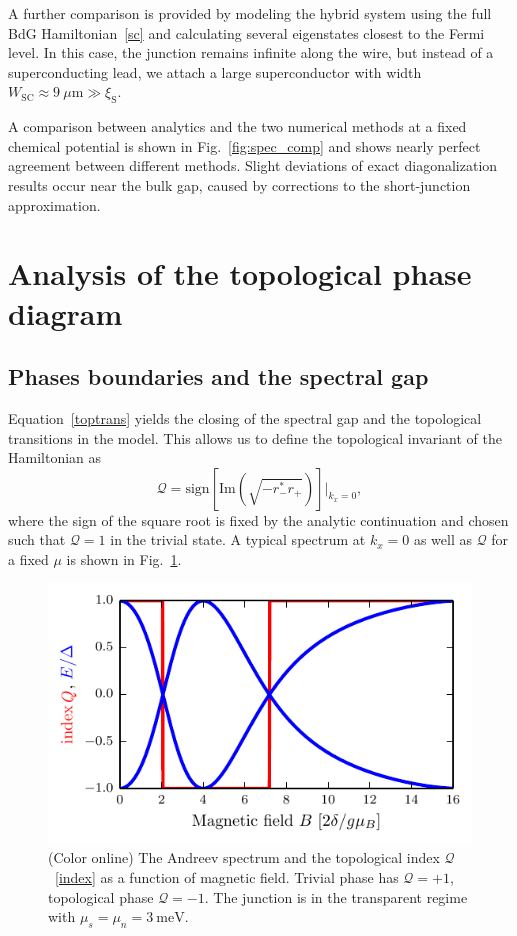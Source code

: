 A further comparison is provided by modeling the hybrid system using the full BdG Hamiltonian~\eqref{sc} and calculating several eigenstates closest to the Fermi level.
In this case, the junction remains infinite along the wire, but instead of a superconducting lead, we attach a large superconductor with width $W_\mathrm{SC} \approx \SI{9}{\mu\m} \gg \xi_\mathrm{S}$.

A comparison between analytics and the two numerical methods at a fixed chemical potential is shown in Fig.~\ref{fig:spec_comp} and shows nearly perfect agreement between different methods.
Slight deviations of exact diagonalization results occur near the bulk gap, caused by corrections to the short-junction approximation.

\section{Analysis of the topological phase diagram}
\label{sec:topphases}

\subsection{Phases boundaries and the spectral gap}
\label{sec:phas-bound-spectr}

Equation~\eqref{toptrans} yields the closing of the spectral gap and the topological transitions in the model.
This allows us to define the topological invariant of the Hamiltonian as
\begin{equation}\label{index}
\mathcal Q=\mathrm{sign}[\mathrm{Im}(\sqrt{-r_-^*r_+})]|_{k_x=0},
\end{equation}
where the sign of the square root is fixed by the analytic continuation and chosen such that $\mathcal Q=1$ in the trivial state.
A typical spectrum at $k_x = 0$ as well as $\mathcal Q$ for a fixed $\mu$ is shown in Fig.~\ref{fig:index}.

\begin{figure}
\includegraphics[width=\columnwidth]{chapter_shortjunction/figures/index}
\caption{(Color online) The Andreev spectrum and the topological index $\mathcal Q$~\eqref{index} as a function of magnetic field.
Trivial phase has $\mathcal{Q}=+1$, topological phase $\mathcal{Q}=-1$.
The junction is in the transparent regime with $\mu_s=\mu_n=\SI{3}{\meV}$.}
\label{fig:index}
\end{figure}

